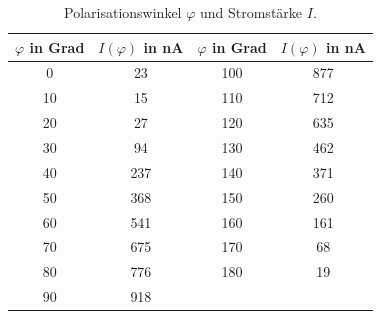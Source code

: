 \begin{table}
 \centering
 \caption{Polarisationswinkel $\varphi$ und Stromstärke $I$.}
 \label{tab:polarisation}
 \begin{tabular}{c c c c}
   \toprule
   $\varphi$ in Grad & $I(\varphi)$ in \si{\nano\ampere} & $\varphi$ in Grad & $I(\varphi)$ in \si{\nano\ampere} \\
   \midrule
   0  & 23 & 100 & 877  \\
   10 & 15 & 110 & 712 \\
   20 & 27 & 120 & 635 \\
   30 & 94  & 130 & 462  \\
   40 & 237  & 140 & 371 \\
   50 & 368 & 150 & 260 \\
   60 & 541  & 160 & 161 \\
   70 & 675   & 170 & 68 \\
   80 & 776 & 180 & 19\\
   90 & 918   & & \\
   \bottomrule
 \end{tabular}
\end{table}
\FloatBarrier
